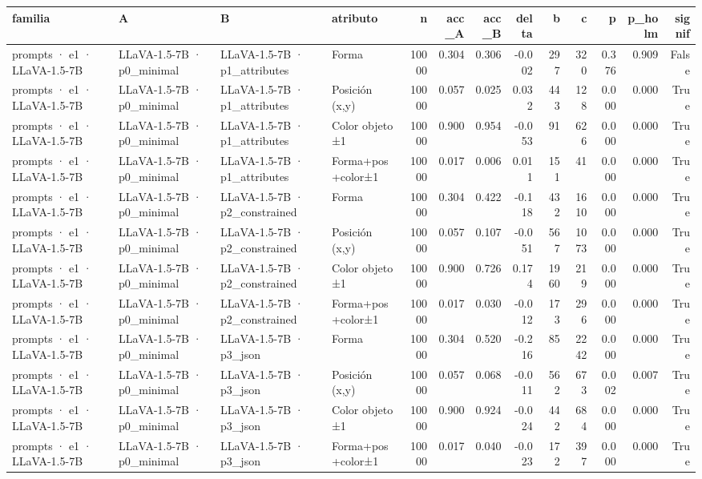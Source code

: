 \begin{tabular}{llllrrrrrrrrr}
\toprule
familia & A & B & atributo & n & acc\_A & acc\_B & delta & b & c & p & p\_holm & signif \\
\midrule
prompts · e1 · LLaVA-1.5-7B & LLaVA-1.5-7B · p0\_minimal & LLaVA-1.5-7B · p1\_attributes & Forma & 10000 & 0.304 & 0.306 & -0.002 & 297 & 320 & 0.376 & 0.909 & False \\
prompts · e1 · LLaVA-1.5-7B & LLaVA-1.5-7B · p0\_minimal & LLaVA-1.5-7B · p1\_attributes & Posición (x,y) & 10000 & 0.057 & 0.025 & 0.032 & 443 & 128 & 0.000 & 0.000 & True \\
prompts · e1 · LLaVA-1.5-7B & LLaVA-1.5-7B · p0\_minimal & LLaVA-1.5-7B · p1\_attributes & Color objeto ±1 & 10000 & 0.900 & 0.954 & -0.053 & 91 & 626 & 0.000 & 0.000 & True \\
prompts · e1 · LLaVA-1.5-7B & LLaVA-1.5-7B · p0\_minimal & LLaVA-1.5-7B · p1\_attributes & Forma+pos+color±1 & 10000 & 0.017 & 0.006 & 0.011 & 151 & 41 & 0.000 & 0.000 & True \\
prompts · e1 · LLaVA-1.5-7B & LLaVA-1.5-7B · p0\_minimal & LLaVA-1.5-7B · p2\_constrained & Forma & 10000 & 0.304 & 0.422 & -0.118 & 432 & 1610 & 0.000 & 0.000 & True \\
prompts · e1 · LLaVA-1.5-7B & LLaVA-1.5-7B · p0\_minimal & LLaVA-1.5-7B · p2\_constrained & Posición (x,y) & 10000 & 0.057 & 0.107 & -0.051 & 567 & 1073 & 0.000 & 0.000 & True \\
prompts · e1 · LLaVA-1.5-7B & LLaVA-1.5-7B · p0\_minimal & LLaVA-1.5-7B · p2\_constrained & Color objeto ±1 & 10000 & 0.900 & 0.726 & 0.174 & 1960 & 219 & 0.000 & 0.000 & True \\
prompts · e1 · LLaVA-1.5-7B & LLaVA-1.5-7B · p0\_minimal & LLaVA-1.5-7B · p2\_constrained & Forma+pos+color±1 & 10000 & 0.017 & 0.030 & -0.012 & 173 & 296 & 0.000 & 0.000 & True \\
prompts · e1 · LLaVA-1.5-7B & LLaVA-1.5-7B · p0\_minimal & LLaVA-1.5-7B · p3\_json & Forma & 10000 & 0.304 & 0.520 & -0.216 & 85 & 2242 & 0.000 & 0.000 & True \\
prompts · e1 · LLaVA-1.5-7B & LLaVA-1.5-7B · p0\_minimal & LLaVA-1.5-7B · p3\_json & Posición (x,y) & 10000 & 0.057 & 0.068 & -0.011 & 562 & 673 & 0.002 & 0.007 & True \\
prompts · e1 · LLaVA-1.5-7B & LLaVA-1.5-7B · p0\_minimal & LLaVA-1.5-7B · p3\_json & Color objeto ±1 & 10000 & 0.900 & 0.924 & -0.024 & 442 & 684 & 0.000 & 0.000 & True \\
prompts · e1 · LLaVA-1.5-7B & LLaVA-1.5-7B · p0\_minimal & LLaVA-1.5-7B · p3\_json & Forma+pos+color±1 & 10000 & 0.017 & 0.040 & -0.023 & 172 & 397 & 0.000 & 0.000 & True \\

\end{tabular}
